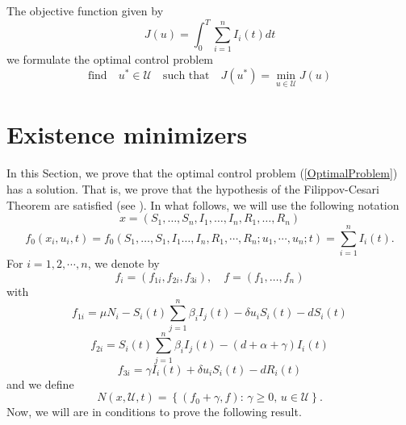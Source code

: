 \documentclass[a4paper,10pt]{article}
\theoremstyle{remark}
\begin{document}
The objective function given by
\[ J( u)=\int_{0}^{T} \sum_{i=1}^{n} I_{i}(t) d t\]
we formulate the optimal control problem 
\begin{equation}\label{OptimalProblem}
\text{find}\quad  u^{*} \in \mathscr{U} \quad \text{such that}\quad 
          J\left( u^{*}\right)=\min _{ u\in  \mathscr{U}} J( u)
\end{equation}



\section{Existence minimizers}

In this Section, we prove that the optimal control problem (\ref{OptimalProblem}) has a solution. That is, we prove that the hypothesis of the Filippov-Cesari Theorem are satisfied (see \cite{A.Seierstad499}). In what follows, we will use the following notation
$$
x=\left(S_{1}, \ldots, S_{n}, I_{1}, \ldots, I_{n}, R_{1},\ldots, R_{n}\right)
$$
\[f_{0}\left(x_{i},  u_{i}, t\right)=f_{0}\left(S_{1}, \ldots, S_{1}, I_{1}\ldots, I_n, R_{1}, \cdots, R_{n} ;  u_{1}, \cdots,  u_{n} ; t\right)=\sum_{i=1}^{n} I_{i}(t).\]
For $i=1,2,\cdots, n$, we denote by
$$
f_{i}=\left(f_{1 i}, f_{2 i}, f_{3 i}\right), \quad  f=\left(f_{1}, \ldots, f_{n}\right) 
$$
with
\[f_{1 i}=\mu N_{i}-S_{i}(t) \sum_{j=1}^{n} \beta_{i} I_{j}(t)-\delta  u_{i} S_{i}(t)-d S_{i}(t)\]
\[f_{2i}=S_{i}(t) \sum_{j=1}^{n} \beta_{i} I_{j}(t)-(d+\alpha+\gamma) I_{i}(t)\]
\[f_{3 i}=\gamma I_{i}(t)+\delta  u_{i} S_{i}(t)-d R_{i}(t)\]
and we define
$$N\left(x, \mathscr{U}, t\right)=\left\{\left(f_{0}+\gamma, f\right):\, \gamma \geq 0,\,  u \in \mathscr{U}\right\}.$$
Now, we will are in conditions to prove the following result.

\end{document}
